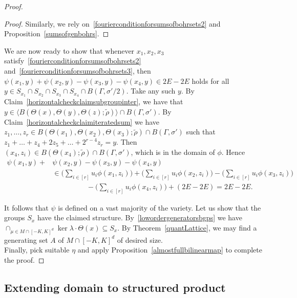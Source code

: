 \documentclass[a4paper,11pt]{article}
\numberwithin{theorem}{section}
\theoremstyle{definition}
\newcommand{\on}[1]{
	\operatorname{#1}
}
\begin{document}
\begin{proof}
    \begin{proof}
        Similarly, we rely on~\eqref{fourierconditionforsumsofbohrsets2} and Proposition~\ref{sumsofgenbohrs}.
    \end{proof}
    
    We are now ready to show that whenever  $x_1, x_2, x_3$ satisfy~\eqref{fourierconditionforsumsofbohrsets2} and~\eqref{fourierconditionforsumsofbohrsets3}, then $\psi(x_1, y) + \psi(x_2, y) - \psi(x_3, y) - \psi(x_4, y) \in 2E - 2E$ holds for all $y \in S_{x_1} \cap S_{x_2} \cap S_{x_3} \cap S_{x_4} \cap B(\Gamma, \sigma'/2)$. Take any such $y$. By Claim~\ref{horizontalcheckclaimsubgroupinter}, we have that $y \in \langle B(\Theta(x), \Theta(y), \Theta(z); \tilde{\rho})\rangle \cap B(\Gamma, \sigma')$. By Claim~\ref{horizontalcheckclaimiteratedsum} we have $z_1, \dots, z_r \in B(\Theta(x_1), \Theta(x_2), \Theta(x_3); \tilde{\rho}) \cap B(\Gamma, \sigma')$ such that $z_1 + \dots + z_4 + 2z_5 + \dots + 2^{r-4} z_r = y$. Then $(x_4, z_i) \in B(\Theta(x_4); \tilde{\rho}) \cap B(\Gamma, \sigma')$, which is in the domain of $\phi$. Hence
    \begin{align*}\psi(x_1, y) +& \psi(x_2, y) - \psi(x_3, y) - \psi(x_4, y)\\
    &\in \Big(\sum_{i \in [r]} u_i\phi(x_1, z_i)\Big) + \Big(\sum_{i \in [r]} u_i\phi(x_2, z_i)\Big) - \Big(\sum_{i \in [r]} u_i\phi(x_3, z_i)\Big)\\
    &\hspace{2cm}-\Big(\sum_{i \in [r]} u_i\phi(x_4, z_i)\Big) + (2E - 2E) = 2E - 2E.\end{align*}

    It follows that $\psi$ is defined on a vast majority of the variety. Let us show that the groups $S_x$ have the claimed structure. By~\eqref{lowordergeneratorsbgps} we have $\cap_{\mu \in M \cap [-K, K]^d} \on{ker} \lambda \cdot \Theta(x) \subseteq S_x$. By Theorem~\ref{quantLattice}, we may find a generating set $A$ of $M \cap [-K, K]^d$ of desired size.\\
    
    Finally, pick suitable $\eta$ and apply Proposition~\ref{almostfullbilinearmap} to complete the proof.
\end{proof}
    




\subsection{Extending domain to structured product}\label{extendingtoproductsubsec}
\end{document}
